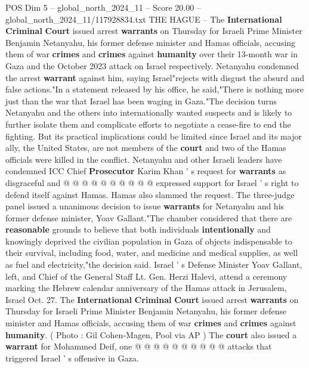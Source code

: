 \begin{textsample}{POS Dim 5 – global\_north\_2024\_11 – Score 20.00 – global\_north\_2024\_11/117928834.txt}  \label{ex:f5_pos_040}
THE HAGUE -- The \textbf{International} \textbf{Criminal} \textbf{Court} issued arrest \textbf{warrants} on Thursday for Israeli Prime Minister Benjamin Netanyahu, his former defense minister and Hamas officials, accusing them of war \textbf{crimes} and \textbf{crimes} against \textbf{humanity} over their 13-month war in Gaza and the October 2023 attack on Israel respectively.
Netanyahu condemned the arrest \textbf{warrant} against him, saying Israel"rejects with disgust the absurd and false actions."In a statement released by his office, he said,"There is nothing more just than the war that Israel has been waging in Gaza."The decision turns Netanyahu and the others into internationally wanted suspects and is likely to further isolate them and complicate efforts to negotiate a cease-fire to end the fighting.
But its practical implications could be limited since Israel and its major ally, the United States, are not members of the \textbf{court} and two of the Hamas officials were killed in the conflict.
Netanyahu and other Israeli leaders have condemned ICC Chief \textbf{Prosecutor} Karim Khan ' s request for \textbf{warrants} as disgraceful and @ @ @ @ @ @ @ @ @ @ expressed support for Israel ' s right to defend itself against Hamas.
Hamas also slammed the request.
The three-judge panel issued a unanimous decision to issue \textbf{warrants} for Netanyahu and his former defense minister, Yoav Gallant."The chamber considered that there are \textbf{reasonable} grounds to believe that both individuals \textbf{intentionally} and knowingly deprived the civilian population in Gaza of objects indispensable to their survival, including food, water, and medicine and medical supplies, as well as fuel and electricity,"the decision said.
Israel ' s Defense Minister Yoav Gallant, left, and Chief of the General Staff Lt.
Gen.
Herzi Halevi, attend a ceremony marking the Hebrew calendar anniversary of the Hamas attack in Jerusalem, Israel Oct. 27.
The \textbf{International} \textbf{Criminal} \textbf{Court} issued arrest \textbf{warrants} on Thursday for Israeli Prime Minister Benjamin Netanyahu, his former defense minister and Hamas officials, accusing them of war \textbf{crimes} and \textbf{crimes} against \textbf{humanity}. ( Photo : Gil Cohen-Magen, Pool via AP ) The \textbf{court} also issued a \textbf{warrant} for Mohammed Deif, one @ @ @ @ @ @ @ @ @ @ attacks that triggered Israel ' s offensive in Gaza.

\end{textsample}
